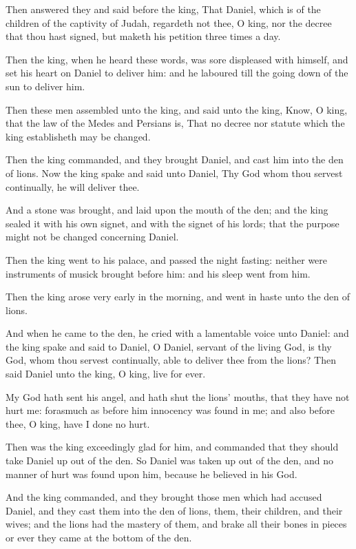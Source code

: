 \Verse Then answered they and said before the king, That Daniel, which is of the children of the captivity of Judah, regardeth not thee, O king, nor the decree that thou hast signed, but maketh his petition three times a day.

\Verse Then the king, when he heard these words, was sore displeased with himself, and set his heart on Daniel to deliver him: and he laboured till the going down of the sun to deliver him.

\Verse Then these men assembled unto the king, and said unto the king, Know, O king, that the law of the Medes and Persians is, That no decree nor statute which the king establisheth may be changed.

\Verse Then the king commanded, and they brought Daniel, and cast him into the den of lions. Now the king spake and said unto Daniel, Thy God whom thou servest continually, he will deliver thee.

\Verse And a stone was brought, and laid upon the mouth of the den; and the king sealed it with his own signet, and with the signet of his lords; that the purpose might not be changed concerning Daniel.

\Verse Then the king went to his palace, and passed the night fasting: neither were instruments of musick brought before him: and his sleep went from him.

\Verse Then the king arose very early in the morning, and went in haste unto the den of lions.

\Verse And when he came to the den, he cried with a lamentable voice unto Daniel: and the king spake and said to Daniel, O Daniel, servant of the living God, is thy God, whom thou servest continually, able to deliver thee from the lions?  \Verse Then said Daniel unto the king, O king, live for ever.

\Verse My God hath sent his angel, and hath shut the lions' mouths, that they have not hurt me: forasmuch as before him innocency was found in me; and also before thee, O king, have I done no hurt.

\Verse Then was the king exceedingly glad for him, and commanded that they should take Daniel up out of the den. So Daniel was taken up out of the den, and no manner of hurt was found upon him, because he believed in his God.

\Verse And the king commanded, and they brought those men which had accused Daniel, and they cast them into the den of lions, them, their children, and their wives; and the lions had the mastery of them, and brake all their bones in pieces or ever they came at the bottom of the den.

